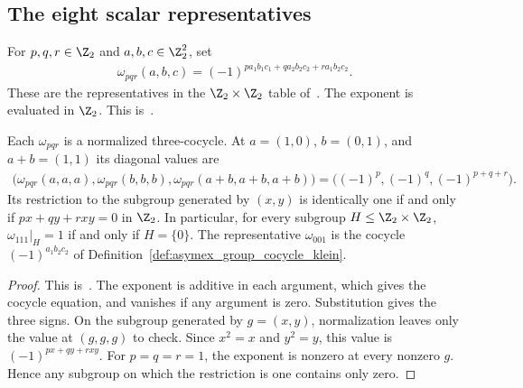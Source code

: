 \subsection{The eight scalar representatives}

\begin{definition}
    \label{def:asymex_klein_cocycle_family}
    \leanok
    For $p,q,r\in\Z_2$ and $a,b,c\in\Z_2^2$, set
    \begin{align}
        \omega_{pqr}(a,b,c)
        =(-1)^{p a_1b_1c_1+q a_2b_2c_2+r a_1b_2c_2}.
    \end{align}
    These are the representatives in the $\Z_2\times\Z_2$ table
    of~\cite[Section~6]{GarreRubio2023MPOSym}. The exponent is evaluated in $\Z_2$.
    This is~\cite[``Klein-four cocycle representatives'']{QICLean2026Blueprint}.
\end{definition}

\begin{lemma}
    \label{thm:asymex_klein_cocycle_restrictions}
    \leanok
    Each $\omega_{pqr}$ is a normalized three-cocycle. At
    $a=(1,0)$, $b=(0,1)$, and $a+b=(1,1)$ its diagonal values are
    \begin{align}
        \bigl(\omega_{pqr}(a,a,a),\omega_{pqr}(b,b,b),
        \omega_{pqr}(a+b,a+b,a+b)\bigr)
        =\bigl((-1)^p,(-1)^q,(-1)^{p+q+r}\bigr).
    \end{align}
    Its restriction to the subgroup generated by $(x,y)$ is identically one
    if and only if $px+qy+rxy=0$ in $\Z_2$. In particular, for every subgroup
    $H\leq\Z_2\times\Z_2$, $\omega_{111}|_H=1$ if and only if $H=\{0\}$.
    The representative $\omega_{001}$ is the cocycle
    $(-1)^{a_1b_2c_2}$ of Definition~\ref{def:asymex_group_cocycle_klein}.
\end{lemma}

\begin{proof}
    \leanok
    This is~\cite[``Cocycle equation and restriction
        signs'']{QICLean2026Blueprint}.
    The exponent is additive in each argument, which gives the cocycle equation,
    and vanishes if any argument is zero. Substitution gives the three signs.
    On the subgroup generated by $g=(x,y)$, normalization leaves only the value
    at $(g,g,g)$ to check. Since $x^2=x$ and $y^2=y$, this value is
    $(-1)^{px+qy+rxy}$. For $p=q=r=1$, the exponent is nonzero at every
    nonzero $g$. Hence any subgroup on which the restriction is one contains
    only zero.
\end{proof}


